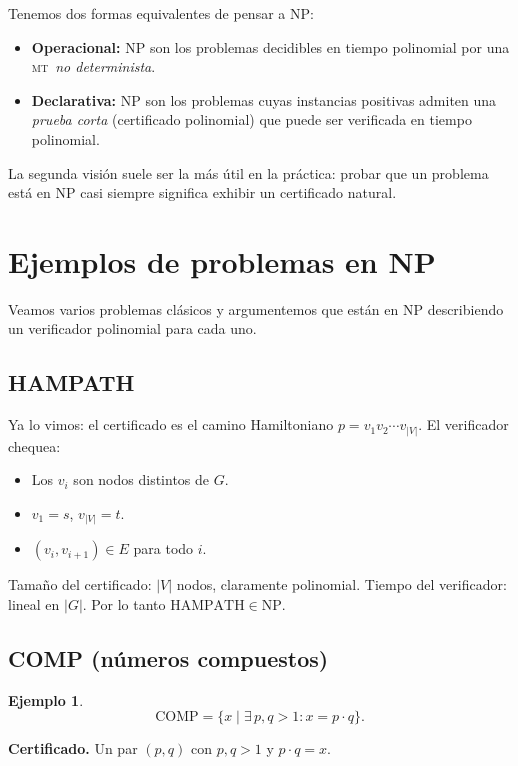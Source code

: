 \documentclass[11pt,a4paper]{article}
\theoremstyle{definicion}
\newtheorem{ejemplo}[definicion]{Ejemplo}
\newcommand{\MT}{\textsc{mt}}
\newcommand{\NP}{\mathrm{NP}}
\begin{document}
\begin{idea}
Tenemos dos formas equivalentes de pensar a $\NP$:
\begin{itemize}
    \item \textbf{Operacional:} $\NP$ son los problemas decidibles en tiempo polinomial por una \MT\ \emph{no determinista}.
    \item \textbf{Declarativa:} $\NP$ son los problemas cuyas instancias positivas admiten una \emph{prueba corta} (certificado polinomial) que puede ser verificada en tiempo polinomial.
\end{itemize}
La segunda visión suele ser la más útil en la práctica: probar que un problema está en $\NP$ casi siempre significa exhibir un certificado natural.
\end{idea}

\section{Ejemplos de problemas en NP}

Veamos varios problemas clásicos y argumentemos que están en $\NP$ describiendo un verificador polinomial para cada uno.

\subsection{HAMPATH}

Ya lo vimos: el certificado es el camino Hamiltoniano $p = v_1 v_2 \cdots v_{|V|}$. El verificador chequea:
\begin{itemize}
    \item Los $v_i$ son nodos distintos de $G$.
    \item $v_1 = s$, $v_{|V|} = t$.
    \item $(v_i, v_{i+1}) \in E$ para todo $i$.
\end{itemize}
Tamaño del certificado: $|V|$ nodos, claramente polinomial. Tiempo del verificador: lineal en $|G|$. Por lo tanto $\mathrm{HAMPATH} \in \NP$.

\subsection{COMP (números compuestos)}

\begin{ejemplo}
\[
\mathrm{COMP} = \{ x \mid \exists\, p, q > 1 : x = p \cdot q\}.
\]
\end{ejemplo}

\textbf{Certificado.} Un par $(p, q)$ con $p, q > 1$ y $p \cdot q = x$.
\end{document}
